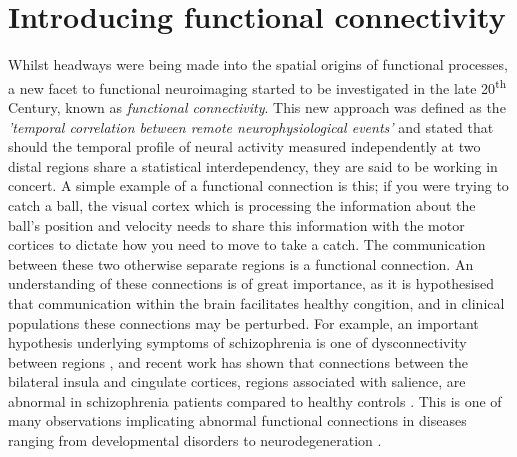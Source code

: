 \section{Introducing functional connectivity}
Whilst headways were being made into the spatial origins of functional processes, a new facet to functional neuroimaging started to be investigated in the late 20\textsuperscript{th} Century, known as \textit{functional connectivity}. This new approach was defined as the \textit{'temporal correlation between remote neurophysiological events'} \citep{Friston1994} and stated that should the temporal profile of neural activity measured independently at two distal regions share a statistical interdependency, they are said to be working in concert. A simple example of a functional connection is this; if you were trying to catch a ball, the visual cortex which is processing the information about the ball's position and velocity needs to share this information with the motor cortices to dictate how you need to move to take a catch. The communication between these two otherwise separate regions is a functional connection. An understanding of these connections is of great importance, as it is hypothesised that communication within the brain facilitates healthy congition, and in clinical populations these connections may be perturbed. For example, an important
hypothesis underlying symptoms of schizophrenia is one of dysconnectivity between regions \citep{Friston1998}, and recent work has shown that connections between the bilateral insula and cingulate cortices, regions associated with salience, are abnormal in schizophrenia patients compared to healthy controls \citep{Palaniyappan2012}. This is one of many observations implicating abnormal functional connections in diseases ranging from developmental disorders \citep{Tomasi2012,Maccotta2013,Haneef2014,Kessler2014} to neurodegeneration \citep{Grady2001,Allen2007,Wang2007,Hawellek2011,Hacker2012,Leavitt2014}.

